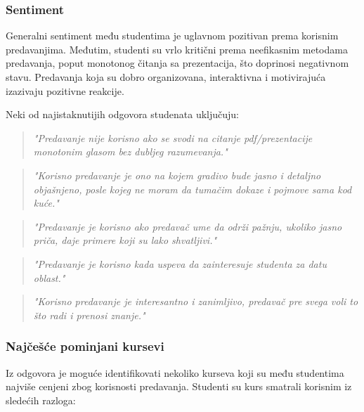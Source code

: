 \documentclass{article}
\begin{document}
\subsubsection{Sentiment}

Generalni sentiment među studentima je uglavnom pozitivan prema korisnim predavanjima. Međutim, studenti su vrlo kritični prema neefikasnim metodama predavanja, poput monotonog čitanja sa prezentacija, što doprinosi negativnom stavu. Predavanja koja su dobro organizovana, interaktivna i motivirajuća izazivaju pozitivne reakcije.

Neki od najistaknutijih odgovora studenata uključuju:

\begin{quote}
    \textit{"Predavanje nije korisno ako se svodi na citanje pdf/prezentacije monotonim glasom bez dubljeg razumevanja."}
\end{quote}

\begin{quote}
    \textit{"Korisno predavanje je ono na kojem gradivo bude jasno i detaljno objašnjeno, posle kojeg ne moram da tumačim dokaze i pojmove sama kod kuće."}
\end{quote}

\begin{quote}
    \textit{"Predavanje je korisno ako predavač ume da održi pažnju, ukoliko jasno priča, daje primere koji su lako shvatljivi."}
\end{quote}

\begin{quote}
    \textit{"Predavanje je korisno kada uspeva da zainteresuje studenta za datu oblast."}
\end{quote}

\begin{quote}
    \textit{"Korisno predavanje je interesantno i zanimljivo, predavač pre svega voli to što radi i prenosi znanje."}
\end{quote}
\subsubsection{Najčešće pominjani kursevi}
Iz odgovora je moguće identifikovati nekoliko kurseva koji su među studentima najviše cenjeni zbog korisnosti predavanja. Studenti su kurs smatrali korisnim iz sledećih razloga:
\end{document}
